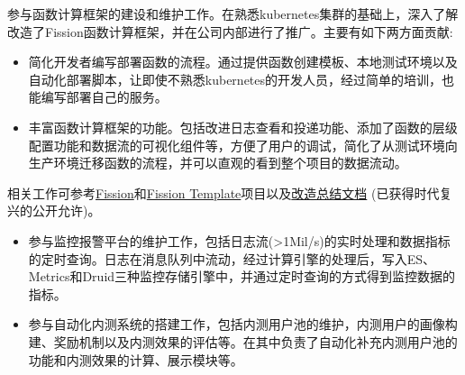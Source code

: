 \documentclass{resume}
\begin{document}
  
    参与函数计算框架的建设和维护工作。在熟悉kubernetes集群的基础上，深入了解改造了Fission函数计算框架，并在公司内部进行了推广。主要有如下两方面贡献:
  \begin{itemize}[topsep = 0 pt, partopsep = 0pt]
    \item 简化开发者编写部署函数的流程。通过提供函数创建模板、本地测试环境以及自动化部署脚本，让即使不熟悉kubernetes的开发人员，经过简单的培训，也能编写部署自己的服务。
    \item 丰富函数计算框架的功能。包括改进日志查看和投递功能、添加了函数的层级配置功能和数据流的可视化组件等，方便了用户的调试，简化了从测试环境向生产环境迁移函数的流程，并可以直观的看到整个项目的数据流动。
  \end{itemize}
    相关工作可参考\href{https://github.com/jingtaozhang18/fission}{Fission}和\href{https://github.com/jingtaozhang18/fission-template}{Fission Template}项目以及\href{https://jingtao.fun/posts/1a3c5fa5/}{改造总结文档} (已获得时代复兴的公开允许)。
  
  \begin{itemize}[topsep = 0 pt, partopsep = 0pt]
    \item 参与监控报警平台的维护工作，包括日志流(>1Mil/s)的实时处理和数据指标的定时查询。日志在消息队列中流动，经过计算引擎的处理后，写入ES、Metrics和Druid三种监控存储引擎中，并通过定时查询的方式得到监控数据的指标。
    \item 参与自动化内测系统的搭建工作，包括内测用户池的维护，内测用户的画像构建、奖励机制以及内测效果的评估等。在其中负责了自动化补充内测用户池的功能和内测效果的计算、展示模块等。
  \end{itemize}
  
\end{document}

